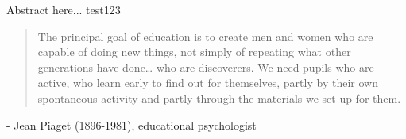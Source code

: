 \abstract{}
Abstract here... test123

\begin{quote}
The principal goal of education is to create men and women who are capable of doing new things, not simply of repeating what other generations have done… who are discoverers. We need pupils who are active, who learn early to find out for themselves, partly by their own spontaneous activity and partly through the materials we set up for them.
\end{quote}
 - Jean Piaget (1896-1981), educational psychologist

\newpage
\tableofcontents
\newpage